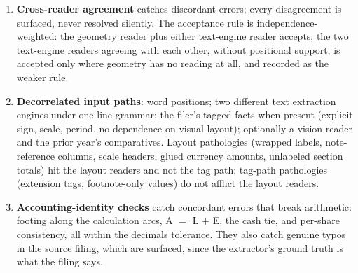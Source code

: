 \documentclass[11pt]{article}
\begin{document}
\begin{enumerate}
  \item \textbf{Cross-reader agreement} catches discordant errors; every disagreement is surfaced, never resolved silently. The acceptance rule is independence-weighted: the geometry reader plus either text-engine reader accepts; the two text-engine readers agreeing with each other, without positional support, is accepted only where geometry has no reading at all, and recorded as the weaker rule.
  \item \textbf{Decorrelated input paths}: word positions; two different text extraction engines under one line grammar; the filer's tagged facts when present (explicit sign, scale, period, no dependence on visual layout); optionally a vision reader and the prior year's comparatives. Layout pathologies (wrapped labels, note-reference columns, scale headers, glued currency amounts, unlabeled section totals) hit the layout readers and not the tag path; tag-path pathologies (extension tags, footnote-only values) do not afflict the layout readers.
  \item \textbf{Accounting-identity checks} catch concordant errors that break arithmetic: footing along the calculation arcs, A $=$ L $+$ E, the cash tie, and per-share consistency, all within the decimals tolerance. They also catch genuine typos in the source filing, which are surfaced, since the extractor's ground truth is what the filing says.
\end{enumerate}
\end{document}
